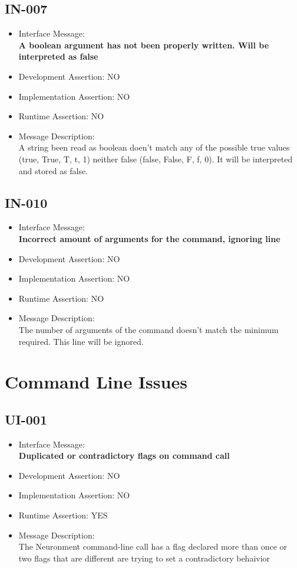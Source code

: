 \subsection{IN-007}
\begin{itemize}
  \item Interface Message:\\[1em]\textbf{A boolean argument has not been properly written. Will be interpreted as false}
  \item Development Assertion: NO
  \item Implementation Assertion: NO
  \item Runtime Assertion: NO
  \item Message Description:\\[1em]A string been read as boolean doen't match any of the possible true values (true, True, T, t, 1) neither false (false, False, F, f, 0). It will be interpreted and stored as false.
\end{itemize}

\subsection{IN-010}
\begin{itemize}
  \item Interface Message:\\[1em]\textbf{Incorrect amount of arguments for the command, ignoring line}
  \item Development Assertion: NO
  \item Implementation Assertion: NO
  \item Runtime Assertion: NO
  \item Message Description:\\[1em]The number of arguments of the command doesn't match the minimum required. This line will be ignored.
\end{itemize}

\section{Command Line Issues}

\subsection{UI-001}
\begin{itemize}
  \item Interface Message:\\[1em]\textbf{Duplicated or contradictory flags on command call}
  \item Development Assertion: NO
  \item Implementation Assertion: NO
  \item Runtime Assertion: YES
  \item Message Description:\\[1em]The Neuronment command-line call has a flag declared more than once or two flags that are different are trying to set a contradictory behaivior
\end{itemize}

